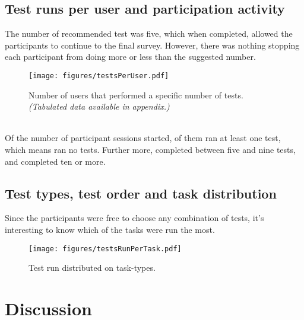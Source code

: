 \documentclass[nofilelist,dvipsnames]{cslthse-msc}
\begin{document}
			\subsection{Test runs per user and participation activity}

				The number of recommended test was five, which when completed, allowed
				the participants to continue to the final survey. However, there was
				nothing stopping each participant from doing more or less than the
				suggested number.

				\begin{figure}[h!]
					\centering
					\texttt{[image: figures/testsPerUser.pdf]}
					\caption{Number of users that performed a specific number of tests.
						\textit{(Tabulated data available in appendix.)}}
				\end{figure}

        \ \\
        Of the  number of participant sessions started,
        of them ran at least one test, which means  ran
        no tests. Further more,  completed between
        five and nine tests, and  completed ten or
        more.

      \subsection{Test types, test order and task distribution}

        Since the participants were free to choose any combination of tests,
        it's interesting to know which of the tasks were run the most.

				\begin{figure}[h!]
					\centering
					\texttt{[image: figures/testsRunPerTask.pdf]}
					\caption{Test run distributed on task-types.}
				\end{figure}



		\section{Discussion}
\end{document}
